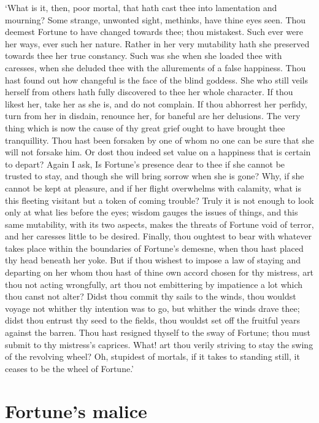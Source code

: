 \documentclass[11pt]{book}
\begin{document}
`What is it, then, poor mortal, that hath cast thee into lamentation and
mourning? Some strange, un\-wont\-ed sight, methinks, have thine eyes seen.
Thou deemest Fortune to have changed towards thee; thou mistakest. Such
ever were her ways, ever such her nature. Rather in her very mutability
hath she preserved towards thee her true constancy. Such was she when
she loaded thee with caresses, when she deluded thee with the
allurements of a false happiness. Thou hast found out how changeful is
the face of the blind goddess. She who still veils herself from others
hath fully discovered to thee her whole character. If thou likest her,
take her as she is, and do not complain. If thou abhorrest her perfidy,
turn from her in disdain, renounce her, for baneful are her delusions.
The very thing which is now the cause of thy great grief ought to have
brought thee tranquillity. Thou hast been forsaken by one of whom no one
can be sure that she will not forsake him. Or dost thou indeed set value
on a happiness that is certain to depart? Again I ask, Is Fortune's
presence dear to thee if she cannot be trusted to stay, and though she
will bring sorrow when she is gone? Why, if she cannot be kept at
pleasure, and if her flight overwhelms with calamity, what is this
fleeting visitant but a token of coming trouble? Truly it is not enough
to look only at what lies before the eyes; wisdom gauges the issues of
things, and this same mutability, with its two aspects, makes the
threats of Fortune void of terror, and her caresses little to be
desired. Finally, thou oughtest to bear with whatever takes place within
the boundaries of Fortune's demesne, when thou hast placed thy head
beneath her yoke. But if thou wishest to impose a law of staying and
departing on her whom thou hast of thine own accord chosen for thy
mistress, art thou not acting wrongfully, art thou not embittering by
impatience a lot which thou canst not alter? Didst thou commit thy sails
to the winds, thou wouldst voyage not whither thy intention was to go,
but whither the winds drave thee; didst thou entrust thy seed to the
fields, thou wouldst set off the fruitful years against the barren. Thou
hast resigned thyself to the sway of Fortune; thou must submit to thy
mistress's caprices. What! art thou verily striving to stay the swing
of the revolving wheel? Oh, stupidest of mortals, if it takes to
standing still, it ceases to be the wheel of Fortune.'


\section{Fortune's malice}
\end{document}

